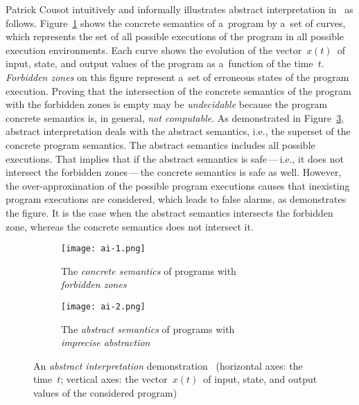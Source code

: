 Patrick Cousot intuitively and informally illustrates abstract interpretation in~\cite{AIInNutshellCousot} as follows. Figure~\ref{fig:ai1} shows the concrete semantics of a~program by a~set of curves, which represents the set of all possible executions of the program in all possible execution environments. Each curve shows the evolution of the vector~$ x(t) $~of input, state, and output values of the program as a~function of the time~$ t $. \emph{Forbidden zones} on this figure represent a~set of erroneous states of the program execution. Proving that the intersection of the concrete semantics of the program with the forbidden zones is empty may be \emph{undecidable} because the program concrete semantics is, in general, \emph{not computable}. As demonstrated in Figure~\ref{fig:ai2}, abstract interpretation deals with the abstract semantics, i.e., the superset of the concrete program semantics. The abstract semantics includes all possible executions. That implies that if the abstract semantics is safe\,---\,i.e., it does not intersect the forbidden zones\,---\,the concrete semantics is safe as well. However, the over-approximation of the possible program executions causes that inexisting program executions are considered, which leads to false alarms, as demonstrates the figure. It is the case when the abstract semantics intersects the forbidden zone, whereas the concrete semantics does not intersect it.

\begin{figure}[hbt]
    \centering

    \begin{subfigure}[t]{.49 \linewidth}
        \centering
        \texttt{[image: ai-1.png]}
        \caption{The \emph{concrete semantics} of programs with \\ \emph{forbidden zones}}
        \label{fig:ai1}
    \end{subfigure}
%
    \hfill
%
    \begin{subfigure}[t]{.49 \linewidth}
        \centering
        \texttt{[image: ai-2.png]}
        \caption{The \emph{abstract semantics} of programs with \\ \emph{imprecise abstraction}}
        \label{fig:ai2}
    \end{subfigure}

    \caption{An \emph{abstract interpretation} demonstration~\cite{AIInNutshellCousot} (horizontal axes: the time~$ t $; vertical axes: the vector~$ x(t) $~of input, state, and output values of the considered program)}
\end{figure}

